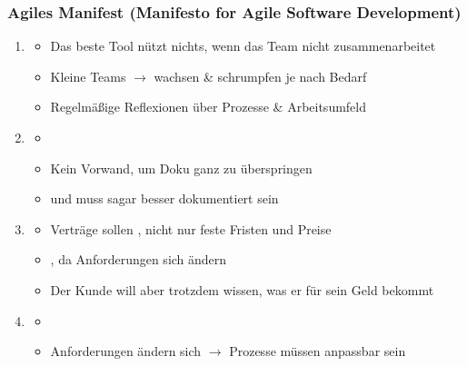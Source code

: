 \subsubsection*{Agiles Manifest (Manifesto for Agile Software Development)}
\begin{enumerate}
    \item {}
    \begin{itemize}
        \item Das beste Tool nützt nichts, wenn das Team nicht zusammenarbeitet
        \item Kleine Teams $\rightarrow$ wachsen \& schrumpfen je nach Bedarf
        \item Regelmäßige Reflexionen über Prozesse \& Arbeitsumfeld
    \end{itemize}
    \item {}
    \begin{itemize}
        \item {}
        \item Kein Vorwand, um Doku ganz zu überspringen
        \item {} und muss sagar besser dokumentiert sein
    \end{itemize}
    \item {}
    \begin{itemize}
        \item Verträge sollen , nicht nur feste Fristen und Preise
        \item {}, da Anforderungen sich ändern
        \item Der Kunde will aber trotzdem wissen, was er für sein Geld bekommt
    \end{itemize}
    \item {}
    \begin{itemize}
        \item {}
        \item Anforderungen ändern sich $\rightarrow$ Prozesse müssen anpassbar sein
    \end{itemize}
\end{enumerate}
